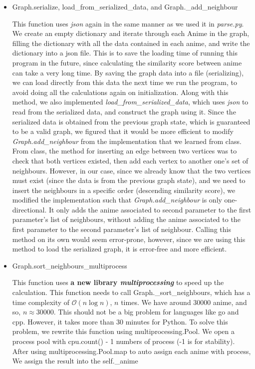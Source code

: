 \documentclass[12pt]{article}
\begin{document}
\begin{enumerate}
\begin{text}
\begin{itemize}
\begin{itemize}
        \item Graph.serialize, load\_from\_serialized\_data, and Graph.\_add\_neighbour
        
            This function uses \textit{json} again in the same manner as we used it in \textit{parse.py}. We create an empty dictionary and iterate through each Anime in the graph, filling the dictionary with all the data contained in each anime, and write the dictionary into a json file. This is to save the loading time of running this program in the future, since calculating the similarity score between anime can take a very long time. By saving the graph data into a file (serializing), we can load directly from this data the next time we run the program, to avoid doing all the calculations again on initialization. Along with this method, we also implemented \textit{load\_from\_serialized\_data}, which uses \textit{json} to read from the serialized data, and construct the graph using it. Since the serialized data is obtained from the previous graph state, which is guaranteed to be a valid graph, we figured that it would be more efficient to modify \textit{Graph.add\_neighbour} from the implementation that we learned from class. From class, the method for inserting an edge between two vertices was to check that both vertices existed, then add each vertex to another one's set of neighbours. However, in our case, since we already know that the two vertices must exist (since the data is from the previous graph state), and we need to insert the neighbours in a specific order (descending similarity score), we modified the implementation such that \textit{Graph.add\_neighbour} is only one-directional. It only adds the anime associated to second parameter to the first parameter's list of neighbours, without adding the anime associated to the first parameter to the second parameter's list of neighbour. Calling this method on its own would seem error-prone, however, since we are using this method to load the serialized graph, it is error-free and more efficient.
            
        \item Graph.sort\_neighbours\_multiprocess
        
            This function uses \textbf{a new library \textit{multiprocessing}} to speed up the calculation. This function needs to call Graph.\_sort\_neighbours, which has a time complexity of $\mathcal{O}(n \log n)$, $n$ times. We have around 30000 anime, and so, $n \approx 30000$. This should not be a big problem for languages like go and cpp. However, it takes more than 30 minutes for Python. To solve this problem, we rewrite this function using multiprocessing.Pool. We open a process pool with cpu.count() - 1 numbers of process (-1 is for stability). After using multiprocessing.Pool.map to auto assign each anime with process, We assign the result into the self.\_anime
            

\end{itemize}
\end{itemize}
\end{text}
\end{enumerate}
\end{document}
